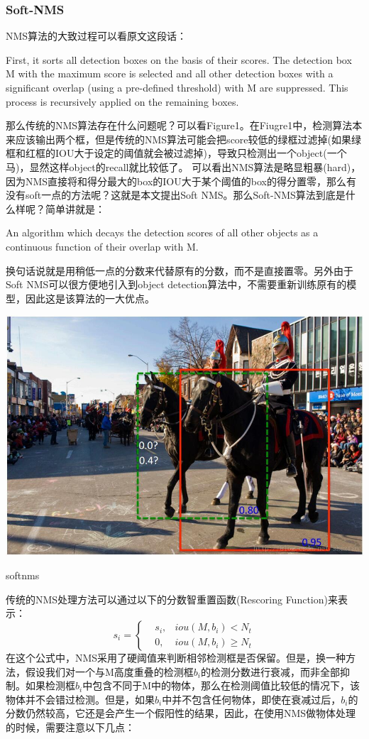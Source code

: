 
\subsubsection{Soft-NMS}
NMS算法的大致过程可以看原文这段话：

First, it sorts all detection boxes on the basis of their scores. The detection box M with the maximum score is selected and all other detection boxes with a significant overlap (using a pre-defined threshold) with M are suppressed. This process is recursively applied on the remaining boxes.

那么传统的NMS算法存在什么问题呢？可以看Figure1。在Fiugre1中，检测算法本来应该输出两个框，但是传统的NMS算法可能会把score较低的绿框过滤掉(如果绿框和红框的IOU大于设定的阈值就会被过滤掉)，导致只检测出一个object(一个马)，显然这样object的recall就比较低了。 
可以看出NMS算法是略显粗暴(hard)，因为NMS直接将和得分最大的box的IOU大于某个阈值的box的得分置零，那么有没有soft一点的方法呢？这就是本文提出Soft NMS。那么Soft-NMS算法到底是什么样呢？简单讲就是：

An algorithm which decays the detection scores of all other objects as a continuous function of their overlap with M.

换句话说就是用稍低一点的分数来代替原有的分数，而不是直接置零。另外由于Soft NMS可以很方便地引入到object detection算法中，不需要重新训练原有的模型，因此这是该算法的一大优点。

\begin{uscfigure}
	\includegraphics[width=\textwidth]{./Pictures/soft-nms.jpeg}	
	\caption{softnms}
\end{uscfigure}

传统的NMS处理方法可以通过以下的分数智重置函数(Rescoring Function)来表示：
\begin{equation}
	s_i = \left\{ 
		\begin{aligned}
		& s_i , &iou (M,b_i) < N_t \\
		& 0, 	&iou(M,b_i) \geq N_t
		\end{aligned}
		\right .
\end{equation}
在这个公式中，NMS采用了硬阈值来判断相邻检测框是否保留。但是，换一种方法，假设我们对一个与M高度重叠的检测框$b_i$的检测分数进行衰减，而非全部抑制。如果检测框$b_i$中包含不同于M中的物体，那么在检测阈值比较低的情况下，该物体并不会错过检测。但是，如果$b_i$中并不包含任何物体，即使在衰减过后，$b_i$的分数仍然较高，它还是会产生一个假阳性的结果，因此，在使用NMS做物体处理的时候，需要注意以下几点：

